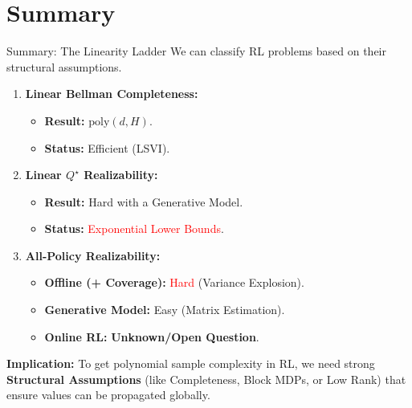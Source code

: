 \documentclass[aspectratio=169]{beamer}
\begin{document}

\section{Summary}

\begin{frame}{Summary: The Linearity Ladder}
    We can classify RL problems based on their structural assumptions.

    \vspace{0.3cm}

    \begin{enumerate}
        \item \textbf{Linear Bellman Completeness:}
        \begin{itemize}
            \item \textbf{Result:} $\text{poly}(d, H)$.
            \item \textbf{Status:} \textcolor{green!60!black}{Efficient} (LSVI).
        \end{itemize}
        \vspace{0.2cm}

\pause        \item \textbf{Linear $Q^\star$ Realizability:}
        \begin{itemize}
            \item \textbf{Result:} Hard with a Generative Model.
            \item \textbf{Status:} \textcolor{red}{Exponential Lower Bounds}.
        \end{itemize}
        \vspace{0.2cm}

\pause        \item \textbf{All-Policy Realizability:}
        \begin{itemize}
            \item \textbf{Offline (+ Coverage):} \textcolor{red}{Hard} (Variance Explosion).
            \item \textbf{Generative Model:} \textcolor{green!60!black}{Easy} (Matrix Estimation).
            \item \textbf{Online RL:} \textbf{Unknown/Open Question}.
        \end{itemize}
    \end{enumerate}
        
    \vspace{0.4cm}
    \textbf{Implication:}
    To get polynomial sample complexity in RL, we need strong \textbf{Structural Assumptions} (like Completeness, Block MDPs, or Low Rank) that ensure values can be propagated globally.
\end{frame}
\end{document}
